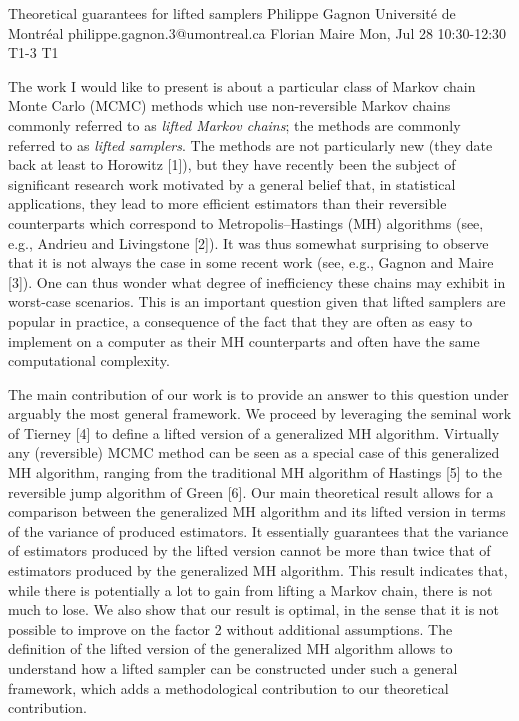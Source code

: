 \begin{talk}
  {Theoretical guarantees for lifted samplers}%
  {Philippe Gagnon}%
  {Université de Montréal}%
  {philippe.gagnon.3@umontreal.ca}%
  {Florian Maire}%
  {}%
  {Mon, Jul 28 10:30-12:30}%
  {T1-3}%
  {T1}%
  {}%
				
			
The work I would like to present is about a particular class of Markov chain Monte Carlo (MCMC) methods which use non-reversible Markov chains commonly referred to as \textit{lifted Markov chains}; the methods are commonly referred to as \textit{lifted samplers}. The methods are not particularly new (they date back at least to Horowitz [1]), but they have recently been the subject of significant research work motivated by a general belief that, in statistical applications, they lead to more efficient estimators than their reversible counterparts which correspond to Metropolis--Hastings (MH) algorithms (see, e.g., Andrieu and Livingstone [2]). It was thus somewhat surprising to observe that it is not always the case in some recent work (see, e.g., Gagnon and Maire [3]). One can thus wonder what degree of inefficiency these chains may exhibit in worst-case scenarios. This is an important question given that lifted samplers are popular in practice, a consequence of the fact that they are often as easy to implement on a computer as their MH counterparts and often have the same computational complexity.

The main contribution of our work is to provide an answer to this question under arguably the most general framework. We proceed by leveraging the seminal work of Tierney [4] to define a lifted version of a generalized MH algorithm. Virtually any (reversible) MCMC method can be seen as a special case of this generalized MH algorithm, ranging from the traditional MH algorithm of Hastings [5] to the reversible jump algorithm of Green [6]. Our main theoretical result allows for a comparison between the generalized MH algorithm and its lifted version in terms of the variance of produced estimators. It essentially guarantees that the variance of estimators produced by the lifted version cannot be more than twice that of estimators produced by the generalized MH algorithm. This result indicates that, while there is potentially a lot to gain from lifting a Markov chain, there is not much to lose. We also show that our result is optimal, in the sense that it is not possible to improve on the factor 2 without additional assumptions. The definition of the lifted version of the generalized MH algorithm allows to understand how a lifted sampler can be constructed under such a general framework, which adds a methodological contribution to our theoretical contribution.


\end{talk}
